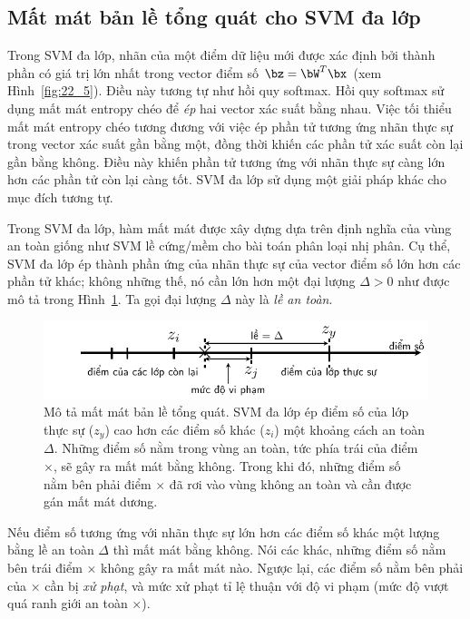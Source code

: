  
\subsection{Mất mát bản lề tổng quát cho SVM đa lớp}
Trong SVM đa lớp, nhãn của một điểm dữ liệu mới được xác định bởi thành phần có
giá trị lớn nhất trong vector điểm số $\bz = \bW^T\bx$ (xem
Hình~\ref{fig:22_5}). Điều này tương tự như hồi quy softmax. Hồi quy softmax sử
dụng mất mát entropy chéo để \textit{ép} hai vector xác suất bằng nhau. Việc tối
thiểu mất mát entropy chéo tương đương với việc ép phần tử tương ứng {nhãn}
thực sự trong vector xác suất gần bằng một, đồng thời khiến các phần tử xác suất
còn lại gần bằng không. Điều này khiến  phần tử tương ứng với nhãn thực sự càng
lớn hơn các phần tử còn lại càng tốt. SVM đa lớp sử dụng một giải pháp khác cho
{mục đích tương tự}.

Trong SVM đa lớp, hàm mất mát được xây dựng dựa trên định nghĩa của vùng an toàn
giống như SVM lề cứng/mềm cho bài toán phân loại nhị phân. Cụ thể, SVM đa lớp ép
thành phần ứng của nhãn thực sự của vector điểm số lớn hơn các phần tử khác;
không những thế, nó cần lớn hơn một đại lượng $\Delta > 0$ như được mô tả trong
Hình~\ref{fig:22_6}. Ta gọi đại lượng $\Delta$ này là \textit{lề an toàn}.

\begin{figure}[t]
\centering
    \includegraphics[width
    =.85\textwidth]{Chapters/09_SupportVectorMachines/22_multiclasssvm/latex/hinge2.pdf}
    \caption[]{Mô tả mất mát bản lề tổng quát. SVM đa lớp ép điểm số của lớp thực sự ($z_y$) cao hơn các điểm số khác
    ($z_i$) một khoảng cách an toàn $\Delta$. Những điểm số nằm trong vùng an toàn, tức phía trái của điểm $\times$, sẽ gây ra mất mát bằng không. Trong khi đó, những điểm số nằm bên phải điểm $\times$ đã rơi vào vùng không an toàn và cần được gán mất mát dương.}
    \label{fig:22_6}
\end{figure}

Nếu điểm số tương ứng với nhãn thực sự lớn hơn các điểm số khác một lượng bằng
lề an toàn $\Delta$ thì mất mát bằng không. Nói các khác, những điểm số nằm bên
trái điểm $\times$ không gây ra mất mát nào. Ngược lại, các điểm số nằm bên phải
của $\times$ cần bị \textit{xử phạt}, và mức xử phạt tỉ lệ thuận với độ vi
phạm (mức độ vượt quá ranh giới an toàn $\times$).
 
